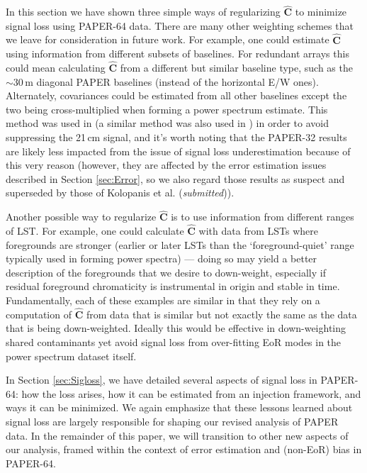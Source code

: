 \documentclass[preprint2,numberedappendix,tighten]{aastex6}  %
\begin{document}
In this section we have shown three simple ways of regularizing $\widehat{\textbf{C}}$ to minimize signal loss using PAPER-64 
data. There are many other weighting schemes that we leave for consideration in future work. For example, one could estimate 
$\widehat{\textbf{C}}$ using information from different subsets of baselines. For redundant arrays this could mean calculating $
\widehat{\textbf{C}}$ from a different but similar baseline type, such as the $\sim30$\,m diagonal PAPER baselines (instead of the 
horizontal E/W ones). Alternately, covariances could be estimated from all other baselines except the two being cross-multiplied 
when forming a power spectrum estimate. This method was used in \citet{parsons_et_al2014} (a similar method was also used in \citet{dillon_et_al2015}) in order to avoid suppressing the 
21\,cm signal, and it's worth noting that the PAPER-32 results are likely less impacted from the issue of signal loss underestimation 
because of this very reason (however, they are affected by the error estimation issues described in Section \ref{sec:Error}, so 
we also regard those results as suspect and superseded by those of Kolopanis et al. (\textit{submitted})).

Another possible way to regularize $\widehat{\textbf{C}}$ is to use information from different ranges of LST. For example, one could 
calculate $\widehat{\textbf{C}}$ with data from LSTs where foregrounds are stronger (earlier or later LSTs than the `foreground-quiet' range typically used in forming power spectra) --- doing so may yield a better description of the foregrounds that we desire to 
down-weight, especially if residual foreground chromaticity is instrumental in origin and stable in time. Fundamentally, each of these examples are similar in that they rely on a computation of $\widehat{\textbf{C}}$ from 
data that is similar but not exactly the same as the data that is being down-weighted. Ideally this would be effective in down-weighting shared contaminants yet avoid signal loss from over-fitting EoR modes in the power spectrum dataset itself. 

In Section \ref{sec:Sigloss}, we have detailed several aspects of signal loss in PAPER-64: how the loss arises, how it can be estimated from an injection framework, and ways it can be minimized. We again emphasize that these lessons learned about signal loss are largely responsible for shaping our revised analysis of PAPER data. In the remainder of this paper, we will transition to other new aspects of our analysis, framed within the context of error estimation and (non-EoR) bias in PAPER-64.
\end{document}
